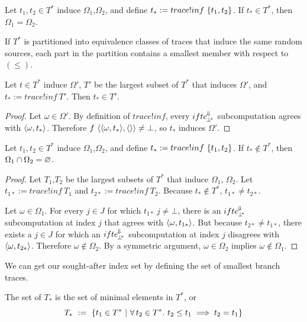 \begin{corollary}
Let $t_1,t_2 \in T^*$ induce $\Omega_1$,$\Omega_2$, and define $t_* := trace!inf~\{{t_1,t_2}\}$.
If $t_* \in T^*$, then $\Omega_1 = \Omega_2$.
\end{corollary}

If $T^*$ is partitioned into equivalence classes of traces that induce the same random sources, each part in the partition contains a smallest member with respect to $(\leq)$.

\begin{theorem}
Let $t \in T^*$ induce $\Omega'$, $T'$ be the largest subset of $T^*$ that induces $\Omega'$, and $t_* := trace!inf~T'$.
Then $t_* \in T'$.
\end{theorem}
\begin{proof}
Let $\omega \in \Omega'$.
By definition of $trace!inf$, every $ifte^{\mspace{-2mu}\Downarrow\mspace{-2mu}}_{\mspace{-2mu}{\bot^{\mspace{-4mu}*}}}$ subcomputation agrees with $\langle{\omega,t_*}\rangle$.
Therefore $f~\langle{\langle{\omega,t_*}\rangle,\langle{}\rangle}\rangle \neq \bot$, so $t_*$ induces $\Omega'$.
\end{proof}

\begin{theorem}
\label{thm:infimum-not-in-T*}
Let $t_1,t_2 \in T^*$ induce $\Omega_1$,$\Omega_2$, and define $t_* := trace!inf~\{{t_1,t_2}\}$.
If $t_* \notin T^*$, then $\Omega_1 \cap \Omega_2 = \varnothing$.
\end{theorem}
\begin{proof}
Let $T_1$,$T_2$ be the largest subsets of $T^*$ that induce $\Omega_1$, $\Omega_2$.
Let $t_{1*} := trace!inf~T_1$ and $t_{2*} := trace!inf~T_2$.
Because $t_* \notin T^*$, $t_{1*} \neq t_{2*}$.

Let $\omega \in \Omega_1$.
For every $j \in J$ for which $t_{1*}~j \neq \bot$, there is an $ifte^{\mspace{-2mu}\Downarrow\mspace{-2mu}}_{\mspace{-2mu}{\bot^{\mspace{-4mu}*}}}$ subcomputation at index $j$ that agrees with $\langle{\omega,t_{1*}}\rangle$.
But because $t_{2*} \neq t_{1*}$, there exists a $j \in J$ for which an $ifte^{\mspace{-2mu}\Downarrow\mspace{-2mu}}_{\mspace{-2mu}{\bot^{\mspace{-4mu}*}}}$ subcomputation at index $j$ disagrees with $\langle{\omega,t_{2*}}\rangle$.
Therefore $\omega \notin \Omega_2$.
By a symmetric argument, $\omega \in \Omega_2$ implies $\omega \notin \Omega_1$.
\end{proof}

We can get our sought-after index set by defining the set of smallest branch traces.

\begin{definition}
The set of  $T_*$ is the set of minimal elements in $T^*$, or
\begin{equation}
	T_*\ :=\ \lbrace {t_1 \in T^*} \ \lvert\ {\forall\,{t_2 \in T^*}\ldotp\, t_2 \leq t_1 \implies t_2 = t_1} \rbrace
\end{equation}
\end{definition}


